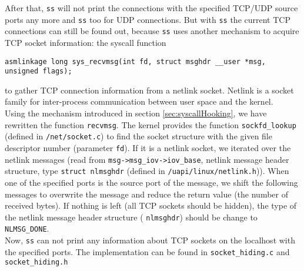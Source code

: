 After that, \texttt{ss} will not print the connections with the specified 
TCP/UDP source ports any more and \texttt{ss} too for UDP connections. But with \texttt{ss} the current TCP connections 
can still be found out, because \texttt{ss} uses another mechanism to acquire TCP 
socket information: the syscall function 
\begin{center}
\lstset{escapechar=,style=customc}
\begin{lstlisting}
asmlinkage long sys_recvmsg(int fd, struct msghdr __user *msg, unsigned flags);
\end{lstlisting}
\end{center}
to gather TCP connection information from a netlink socket. Netlink is a socket 
family for inter-process communication between user space and the kernel.\\
Using the mechanism introduced in section \ref{sec:syscallHooking}, we have 
rewritten the function \verb+recvmsg+. The kernel provides the function 
\verb+sockfd_lookup+ (defined in \verb+/net/socket.c+) to find the socket 
structure with the given file descriptor number (parameter \verb+fd+). If it is 
a netlink socket, we iterated over the netlink messages (read from 
\verb+msg->msg_iov->iov_base+, netlink message header structure, type 
\verb+struct nlmsghdr+ (defined in \verb+/uapi/linux/netlink.h+)). When one 
of the specified ports is the source port of the message, we shift the following 
messages to overwrite the message and reduce the return value (the number of 
received bytes). If nothing is left (all TCP sockets should be hidden), the type 
of the netlink message header structure ( \verb+nlmsghdr+) should be change to 
\verb+NLMSG_DONE+. \\
Now, \texttt{ss} can not print any information about TCP sockets on the 
localhost with the specified ports. The implementation can be found in 
\verb+socket_hiding.c+ and \verb+socket_hiding.h+\\

